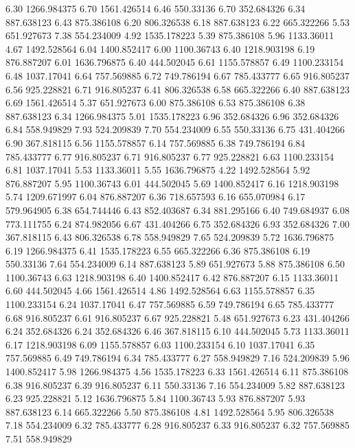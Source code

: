 6.30 	1266.984375
6.70 	1561.426514
6.46 	550.33136
6.70 	352.684326
6.34 	887.638123
6.43 	875.386108
6.20 	806.326538
6.18 	887.638123
6.22 	665.322266
5.53 	651.927673
7.38 	554.234009
4.92 	1535.178223
5.39 	875.386108
5.96 	1133.36011
4.67 	1492.528564
6.04 	1400.852417
6.00 	1100.36743
6.40 	1218.903198
6.19 	876.887207
6.01 	1636.796875
6.40 	444.502045
6.61 	1155.578857
6.49 	1100.233154
6.48 	1037.17041
6.64 	757.569885
6.72 	749.786194
6.67 	785.433777
6.65 	916.805237
6.56 	925.228821
6.71 	916.805237
6.41 	806.326538
6.58 	665.322266
6.40 	887.638123
6.69 	1561.426514
5.37 	651.927673
6.00 	875.386108
6.53 	875.386108
6.38 	887.638123
6.34 	1266.984375
5.01 	1535.178223
6.96 	352.684326
6.96 	352.684326
6.84 	558.949829
7.93 	524.209839
7.70 	554.234009
6.55 	550.33136
6.75 	431.404266
6.90 	367.818115
6.56 	1155.578857
6.14 	757.569885
6.38 	749.786194
6.84 	785.433777
6.77 	916.805237
6.71 	916.805237
6.77 	925.228821
6.63 	1100.233154
6.81 	1037.17041
5.53 	1133.36011
5.55 	1636.796875
4.22 	1492.528564
5.92 	876.887207
5.95 	1100.36743
6.01 	444.502045
5.69 	1400.852417
6.16 	1218.903198
5.74 	1209.671997
6.04 	876.887207
6.36 	718.657593
6.16 	655.070984
6.17 	579.964905
6.38 	654.744446
6.43 	852.403687
6.34 	881.295166
6.40 	749.684937
6.08 	773.111755
6.24 	874.982056
6.67 	431.404266
6.75 	352.684326
6.93 	352.684326
7.00 	367.818115
6.43 	806.326538
6.78 	558.949829
7.65 	524.209839
5.72 	1636.796875
6.19 	1266.984375
6.41 	1535.178223
6.55 	665.322266
6.36 	875.386108
6.19 	550.33136
7.64 	554.234009
6.14 	887.638123
5.89 	651.927673
5.88 	875.386108
6.50 	1100.36743
6.63 	1218.903198
6.40 	1400.852417
6.42 	876.887207
6.15 	1133.36011
6.60 	444.502045
4.66 	1561.426514
4.86 	1492.528564
6.63 	1155.578857
6.35 	1100.233154
6.24 	1037.17041
6.47 	757.569885
6.59 	749.786194
6.65 	785.433777
6.68 	916.805237
6.61 	916.805237
6.67 	925.228821
5.48 	651.927673
6.23 	431.404266
6.24 	352.684326
6.24 	352.684326
6.46 	367.818115
6.10 	444.502045
5.73 	1133.36011
6.17 	1218.903198
6.09 	1155.578857
6.03 	1100.233154
6.10 	1037.17041
6.35 	757.569885
6.49 	749.786194
6.34 	785.433777
6.27 	558.949829
7.16 	524.209839
5.96 	1400.852417
5.98 	1266.984375
4.56 	1535.178223
6.33 	1561.426514
6.11 	875.386108
6.38 	916.805237
6.39 	916.805237
6.11 	550.33136
7.16 	554.234009
5.82 	887.638123
6.23 	925.228821
5.12 	1636.796875
5.84 	1100.36743
5.93 	876.887207
5.93 	887.638123
6.14 	665.322266
5.50 	875.386108
4.81 	1492.528564
5.95 	806.326538
7.18 	554.234009
6.32 	785.433777
6.28 	916.805237
6.33 	916.805237
6.32 	757.569885
7.51 	558.949829
